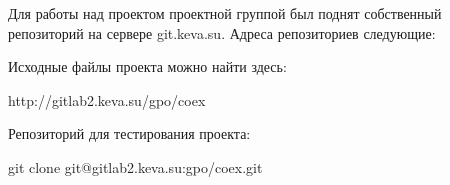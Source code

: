 



Для работы над проектом проектной группой был поднят собственный репозиторий на сервере git.keva.su.
Адреса репозиториев следующие:

Исходные файлы проекта можно найти здесь:

http://gitlab2.keva.su/gpo/coex

Репозиторий для тестирования проекта:

git clone git@gitlab2.keva.su:gpo/coex.git
